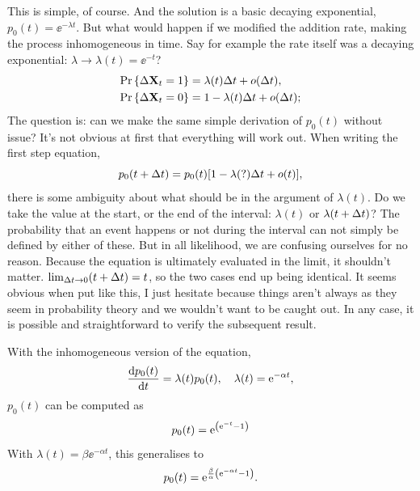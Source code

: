 \noindent
This is simple, of course. And the solution is a basic decaying exponential, $p_0(t) = \ee^{-\lambda t}$. But what would happen if we modified the addition rate, making the process inhomogeneous in time. Say for example the rate itself was a decaying exponential: $\lambda \to \lambda(t) = \ee^{-t}$?  
\begin{align*}
{\text{Pr}\left\{\Delta {{\bf X}_t}= 1\right\}} &= \lambda(t) \Delta t + o(\Delta t),\\
{\text{Pr}\left\{\Delta {{\bf X}_t} = 0\right\}} &= 1 - \lambda(t)  \Delta t + o(\Delta t);
\end{align*}
The question is: can we make the same simple derivation of $p_0(t)$ without issue? It's not obvious at first that  everything will work out. When writing the first step equation,
$$p_0(t+\Delta t) = p_0(t)[1 - \lambda(\mathbf{?}) \Delta t + o(t)],$$
there is some ambiguity about what should be in the argument of $\lambda(t)$. Do we take the value at the start, or the end of the interval: $\lambda(t)$ or $\lambda(t+\Delta t)$? The probability that an event happens or not during the interval can not simply be defined by either of these. But in all likelihood, we are confusing ourselves for no reason. Because the equation is ultimately evaluated in the limit, it shouldn't matter. $\lim_{\Delta t\to0}(t+\Delta t) = t $, so the two cases end up being identical. It seems obvious when put like this, I just hesitate because things aren't always as they seem in probability theory and we wouldn't want to be caught out. In any case, it is possible and straightforward to verify the subsequent result.\par
With the inhomogeneous version of the equation,
$$\displaystyle\frac{{\rm d} p_0(t)}{{\rm d} t} = \lambda(t)p_0(t), \hspace{10pt} \lambda(t) = {\rm e}^{-\alpha t},$$
$p_0(t)$ can be computed as
$$p_0(t) = {\rm e}^{\left({\rm e}^{- t} - 1\right)  }$$  
With $\lambda(t) = \beta \ee^{-\alpha t}$, this generalises to
$$p_0(t) = {\rm e}^{\frac{\beta}{\alpha} \left({\rm e}^{-\alpha t} - 1\right)  }.$$ 





\def\eval{0.36787}


